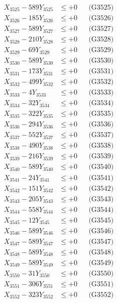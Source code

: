 \documentclass[a4paper,10pt]{article}
\begin{document}
{\begin{align}
X_{3525} - 589Y_{3525} &\leq +0 && \text{(G3525)} \\
X_{3526} - 185Y_{3526} &\leq +0 && \text{(G3526)} \\
X_{3527} - 589Y_{3527} &\leq +0 && \text{(G3527)} \\
X_{3528} - 210Y_{3528} &\leq +0 && \text{(G3528)} \\
X_{3529} - 69Y_{3529} &\leq +0 && \text{(G3529)} \\
X_{3530} - 589Y_{3530} &\leq +0 && \text{(G3530)} \\
\allowbreak
X_{3531} - 173Y_{3531} &\leq +0 && \text{(G3531)} \\
X_{3532} - 499Y_{3532} &\leq +0 && \text{(G3532)} \\
X_{3533} - 4Y_{3533} &\leq +0 && \text{(G3533)} \\
X_{3534} - 32Y_{3534} &\leq +0 && \text{(G3534)} \\
X_{3535} - 322Y_{3535} &\leq +0 && \text{(G3535)} \\
X_{3536} - 294Y_{3536} &\leq +0 && \text{(G3536)} \\
X_{3537} - 552Y_{3537} &\leq +0 && \text{(G3537)} \\
X_{3538} - 490Y_{3538} &\leq +0 && \text{(G3538)} \\
X_{3539} - 216Y_{3539} &\leq +0 && \text{(G3539)} \\
X_{3540} - 589Y_{3540} &\leq +0 && \text{(G3540)} \\
\allowbreak
X_{3541} - 24Y_{3541} &\leq +0 && \text{(G3541)} \\
X_{3542} - 151Y_{3542} &\leq +0 && \text{(G3542)} \\
X_{3543} - 205Y_{3543} &\leq +0 && \text{(G3543)} \\
X_{3544} - 558Y_{3544} &\leq +0 && \text{(G3544)} \\
X_{3545} - 12Y_{3545} &\leq +0 && \text{(G3545)} \\
X_{3546} - 589Y_{3546} &\leq +0 && \text{(G3546)} \\
X_{3547} - 589Y_{3547} &\leq +0 && \text{(G3547)} \\
X_{3548} - 589Y_{3548} &\leq +0 && \text{(G3548)} \\
X_{3549} - 589Y_{3549} &\leq +0 && \text{(G3549)} \\
X_{3550} - 31Y_{3550} &\leq +0 && \text{(G3550)} \\
\allowbreak
X_{3551} - 306Y_{3551} &\leq +0 && \text{(G3551)} \\
X_{3552} - 323Y_{3552} &\leq +0 && \text{(G3552)} \\

\end{align}}
\end{document}
